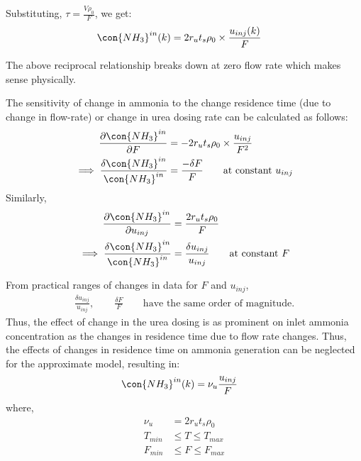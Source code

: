 Substituting, $\tau = \frac{V \rho_0}{F}$, we get:
\begin{align}
    \con{NH_3}^{in} (k) &= 2r_u t_s \rho_0 \times \frac{u_{inj}(k)}{F}
\end{align}

The above reciprocal relationship breaks down at zero flow rate which makes sense physically.

The sensitivity of change in ammonia to the change residence time (due to change in flow-rate) or change in urea dosing rate can be calculated as follows:
\begin{align*}
    \frac{\partial \con{NH_3}^{in} }{\partial F} &= -2 r_u t_s \rho_0 \times \frac{u_{inj}}{F^2} \\
    \implies \frac{\delta \con{NH_3}^{in}}{\con{NH_3}^{in}} &= \frac{-\delta F}{F}
    \qquad \text{at constant } u_{inj}
\end{align*}
Similarly,
\begin{align*}
    \frac{\partial \con{NH_3}^{in} }{\partial u_{inj}} &= \frac{2 r_u t_s \rho_0}{F} \\
    \implies \frac{\delta \con{NH_3}^{in}}{\con{NH_3}^{in}} &= \frac{ \delta u_{inj}}{u_{inj}} \qquad \text{at constant } F
\end{align*}

From practical ranges of changes in data for $F$ and $u_{inj}$,
\begin{align*}
    \frac{ \delta u_{inj}}{u_{inj}}, \qquad \frac{\delta F}{F} \qquad \text{have the same order of magnitude.}
\end{align*}
Thus, the effect of change in the urea dosing is as prominent on inlet ammonia concentration as the changes in residence time due to flow rate changes. Thus, the effects of changes in residence time on ammonia generation can be neglected for the approximate model, resulting in:
\begin{align}
    \con{NH_3}^{in}(k) &= \nu_u \frac{u_{inj}}{F}    \label{eqn::urea_inj}
\end{align}
where,
\begin{align*}
    \nu_u &= 2 r_u t_s \rho_0\\
    T_{min} &\leq T \leq T_{max}\\
    F_{min} &\leq F \leq F_{max}
\end{align*}
